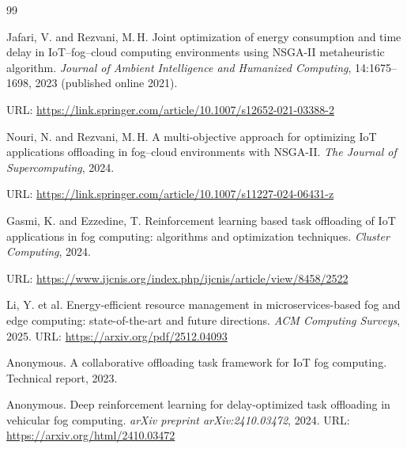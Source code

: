 \documentclass[12pt,a4paper]{article}
\begin{document}



\begin{thebibliography}{99}


Jafari, V. and Rezvani, M.\,H.
\newblock Joint optimization of energy consumption and time delay in
  {IoT}--fog--cloud computing environments using {NSGA-II} metaheuristic
  algorithm.
\newblock \emph{Journal of Ambient Intelligence and Humanized Computing},
  14:1675--1698, 2023 (published online 2021).

\newblock URL: \url{https://link.springer.com/article/10.1007/s12652-021-03388-2}

Nouri, N. and Rezvani, M.\,H.
\newblock A multi-objective approach for optimizing {IoT} applications
  offloading in fog--cloud environments with {NSGA-II}.
\newblock \emph{The Journal of Supercomputing}, 2024.

\newblock URL: \url{https://link.springer.com/article/10.1007/s11227-024-06431-z}

Gasmi, K. and Ezzedine, T.
\newblock Reinforcement learning based task offloading of {IoT} applications in
  fog computing: algorithms and optimization techniques.
\newblock \emph{Cluster Computing}, 2024.

\newblock URL: \url{https://www.ijcnis.org/index.php/ijcnis/article/view/8458/2522}

Li, Y. et al.
\newblock Energy-efficient resource management in microservices-based fog and
  edge computing: state-of-the-art and future directions.
\newblock \emph{ACM Computing Surveys}, 2025.
\newblock URL: \url{https://arxiv.org/pdf/2512.04093}

{Anonymous}.
\newblock A collaborative offloading task framework for {IoT} fog computing.
\newblock Technical report, 2023.

{Anonymous}.
\newblock Deep reinforcement learning for delay-optimized task offloading in
  vehicular fog computing.
\newblock \emph{arXiv preprint arXiv:2410.03472}, 2024.
\newblock URL: \url{https://arxiv.org/html/2410.03472}


\end{thebibliography}
\end{document}
